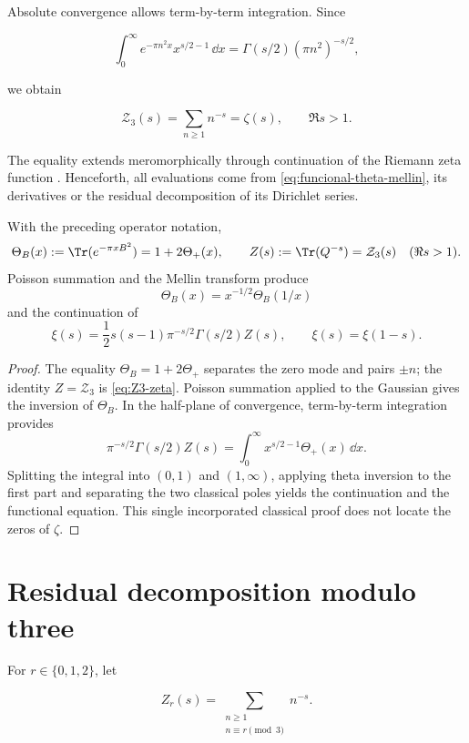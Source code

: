 Absolute convergence allows term-by-term integration. Since

\[
 \int_0^\infty e^{-\pi n^2x}x^{s/2-1}\,\dd x
 =\Gamma(s/2)(\pi n^2)^{-s/2},
\]

we obtain

\begin{equation}
 \mathcal Z_3(s)=\sum_{n\geq1}n^{-s}=\zeta(s),
 \qquad \Re s>1.
 \label{eq:Z3-zeta}
\end{equation}

The equality extends meromorphically through continuation of the Riemann
zeta function \cite{Apostol1976}. Henceforth, all evaluations
come from \eqref{eq:funcional-theta-mellin}, its derivatives or the
residual decomposition of its Dirichlet series.

\begin{theorem}
\label{pf84:C05}
With the preceding operator notation,
\[
 \Theta_B(x):=\Tr(e^{-\pi xB^2})
 =1+2\Theta_+(x),
 \qquad
 Z(s):=\Tr(Q^{-s})=\mathcal Z_3(s)
 \quad(\Re s>1).
\]
Poisson summation and the Mellin transform produce
\[
 \Theta_B(x)=x^{-1/2}\Theta_B(1/x)
\]
and the continuation of
\[
 \xi(s)=\frac12s(s-1)\pi^{-s/2}\Gamma(s/2)Z(s),
 \qquad
 \xi(s)=\xi(1-s).
\]
\end{theorem}

\begin{proof}
The equality \(\Theta_B=1+2\Theta_+\) separates the zero mode and pairs
\(\pm n\); the identity \(Z=\mathcal Z_3\) is
\eqref{eq:Z3-zeta}. Poisson summation applied to the Gaussian gives the
inversion of \(\Theta_B\). In the half-plane of convergence, term-by-term
integration provides
\[
 \pi^{-s/2}\Gamma(s/2)Z(s)
 =\int_0^\infty x^{s/2-1}\Theta_+(x)\,\dd x.
\]
Splitting the integral into \((0,1)\) and \((1,\infty)\), applying theta
inversion to the first part and separating the two classical poles yields the
continuation and the functional equation. This single incorporated classical proof
does not locate the zeros of \(\zeta\).
\end{proof}

\section{Residual decomposition modulo three}

For $r\in\{0,1,2\}$, let

\begin{equation}
 Z_r(s)=
 \sum_{\substack{n\geq1\\n\equiv r\pmod3}}n^{-s}.
 \label{eq:canales-residuales-Zr}
\end{equation}

